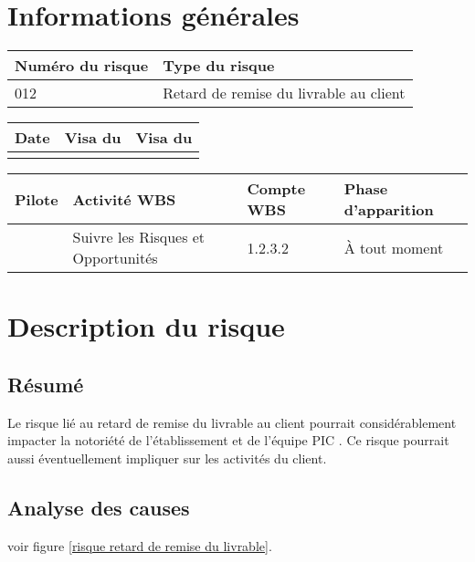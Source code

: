 
\section*{Informations générales}
 
\begin{table}[H]
\centering
	\begin{tabularx}{16.8cm}{|X|X|}
	\hline
	\rowcolor{gray!40} Numéro du risque & Type du risque \\
	\hline
	012 & Retard de remise du livrable au client \\
	\hline
	\end{tabularx}
\end{table}

\begin{table}[H]
\centering
	\begin{tabularx}{16.8cm}{|X|X|X|}
	\hline
	\rowcolor{gray!40} Date & Visa du \RQ & Visa du \CP \\
	\hline
	  &  &  \\
	\hline
	\end{tabularx}
\end{table}

\begin{table}[H]
\centering
	\begin{tabularx}{16.8cm}{|X|X|X|X|}
	\hline
	\rowcolor{gray!40} Pilote & Activité WBS & Compte WBS & Phase d'apparition \\
	\hline
	 \Kafui & Suivre les Risques et Opportunités & 1.2.3.2 & À tout moment\\
	\hline
	\end{tabularx}
\end{table}

\section*{Description du risque}

\subsection*{Résumé}
	Le risque lié au retard de remise du livrable au client pourrait considérablement impacter la notoriété de l'établissement et de l'équipe PIC . Ce risque pourrait aussi éventuellement impliquer sur les activités du client.
	
\subsection*{Analyse des causes}
	voir figure \ref{risque retard de remise du livrable}.

